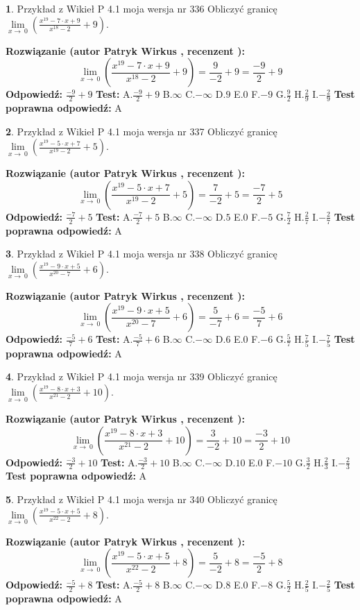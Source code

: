 \documentclass[12pt, a4paper]{article}
\theoremstyle{definition} %
\newtheorem{zad}{}
\newcommand{\zadStart}[1]{\begin{zad}#1\newline}
\newcommand{\zadStop}{\end{zad}}
\newcommand{\rozwStart}[2]{\noindent \textbf{Rozwiązanie (autor #1 , recenzent #2): }\newline}
\newcommand{\rozwStop}{\newline}
\newcommand{\odpStart}{\noindent \textbf{Odpowiedź:}\newline}
\newcommand{\odpStop}{\newline}
\newcommand{\testStart}{\noindent \textbf{Test:}\newline}
\newcommand{\testStop}{\newline}
\newcommand{\kluczStart}{\noindent \textbf{Test poprawna odpowiedź:}\newline}
\newcommand{\kluczStop}{\newline}
\begin{document}
\zadStart{Przykład z Wikieł P 4.1 moja wersja nr 336}
Obliczyć granicę $\lim\limits_{x\to\ 0}(\frac{x^{19}-7 \cdot x +9}{x^{18}-2}+9)$.
\zadStop
\rozwStart{Patryk Wirkus}{}
$$\lim\limits_{x\to\ 0}(\frac{x^{19}-7 \cdot x +9}{x^{18}-2}+9)=\frac{9}{-2}+9=\frac{-9}{2}+9$$
\rozwStop
\odpStart
$\frac{-9}{2}+9$
\odpStop
\testStart
A.$\frac{-9}{2}+9$
B.$\infty$
C.$-\infty$
D.$9$
E.$0$
F.$-9$
G.$\frac{9}{2}$
H.$\frac{2}{9}$
I.$-\frac{2}{9}$
\testStop
\kluczStart
A
\kluczStop



\zadStart{Przykład z Wikieł P 4.1 moja wersja nr 337}
Obliczyć granicę $\lim\limits_{x\to\ 0}(\frac{x^{19}-5 \cdot x +7}{x^{19}-2}+5)$.
\zadStop
\rozwStart{Patryk Wirkus}{}
$$\lim\limits_{x\to\ 0}(\frac{x^{19}-5 \cdot x +7}{x^{19}-2}+5)=\frac{7}{-2}+5=\frac{-7}{2}+5$$
\rozwStop
\odpStart
$\frac{-7}{2}+5$
\odpStop
\testStart
A.$\frac{-7}{2}+5$
B.$\infty$
C.$-\infty$
D.$5$
E.$0$
F.$-5$
G.$\frac{7}{2}$
H.$\frac{2}{7}$
I.$-\frac{2}{7}$
\testStop
\kluczStart
A
\kluczStop



\zadStart{Przykład z Wikieł P 4.1 moja wersja nr 338}
Obliczyć granicę $\lim\limits_{x\to\ 0}(\frac{x^{19}-9 \cdot x +5}{x^{20}-7}+6)$.
\zadStop
\rozwStart{Patryk Wirkus}{}
$$\lim\limits_{x\to\ 0}(\frac{x^{19}-9 \cdot x +5}{x^{20}-7}+6)=\frac{5}{-7}+6=\frac{-5}{7}+6$$
\rozwStop
\odpStart
$\frac{-5}{7}+6$
\odpStop
\testStart
A.$\frac{-5}{7}+6$
B.$\infty$
C.$-\infty$
D.$6$
E.$0$
F.$-6$
G.$\frac{5}{7}$
H.$\frac{7}{5}$
I.$-\frac{7}{5}$
\testStop
\kluczStart
A
\kluczStop



\zadStart{Przykład z Wikieł P 4.1 moja wersja nr 339}
Obliczyć granicę $\lim\limits_{x\to\ 0}(\frac{x^{19}-8 \cdot x +3}{x^{21}-2}+10)$.
\zadStop
\rozwStart{Patryk Wirkus}{}
$$\lim\limits_{x\to\ 0}(\frac{x^{19}-8 \cdot x +3}{x^{21}-2}+10)=\frac{3}{-2}+10=\frac{-3}{2}+10$$
\rozwStop
\odpStart
$\frac{-3}{2}+10$
\odpStop
\testStart
A.$\frac{-3}{2}+10$
B.$\infty$
C.$-\infty$
D.$10$
E.$0$
F.$-10$
G.$\frac{3}{2}$
H.$\frac{2}{3}$
I.$-\frac{2}{3}$
\testStop
\kluczStart
A
\kluczStop



\zadStart{Przykład z Wikieł P 4.1 moja wersja nr 340}
Obliczyć granicę $\lim\limits_{x\to\ 0}(\frac{x^{19}-5 \cdot x +5}{x^{22}-2}+8)$.
\zadStop
\rozwStart{Patryk Wirkus}{}
$$\lim\limits_{x\to\ 0}(\frac{x^{19}-5 \cdot x +5}{x^{22}-2}+8)=\frac{5}{-2}+8=\frac{-5}{2}+8$$
\rozwStop
\odpStart
$\frac{-5}{2}+8$
\odpStop
\testStart
A.$\frac{-5}{2}+8$
B.$\infty$
C.$-\infty$
D.$8$
E.$0$
F.$-8$
G.$\frac{5}{2}$
H.$\frac{2}{5}$
I.$-\frac{2}{5}$
\testStop
\kluczStart
A
\kluczStop
\end{document}
